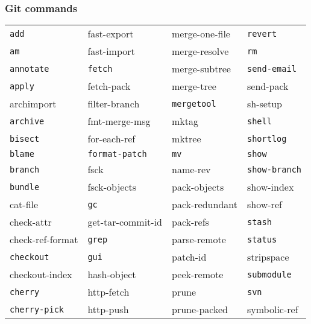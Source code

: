 \documentclass[english]{beamer}
\newcommand{\CMD}[1]{
  \texttt{\textcolor{code-green}{#1}}
}
\newcommand{\cmd}[1]{
  \texttt{\textcolor{code-orange}{#1}}
}
\newcommand{\gui}[1]{
  \texttt{\textcolor{code-blue}{#1}}
}
\begin{document}
\begin{frame}[fragile]
\frametitle{Git commands}
{\tiny \tt \textcolor{gray}{
\begin{tabular}{llll}
\CMD{add}              &      fast-export       &      merge-one-file & \cmd{revert}            \\
\cmd{am}               &      fast-import       &      merge-resolve  & \CMD{rm}                \\
\cmd{annotate}         & \CMD{fetch}            &      merge-subtree  & \cmd{send-email}        \\
\cmd{apply}            &      fetch-pack        &      merge-tree     &      send-pack          \\
     archimport        &      filter-branch     & \gui{mergetool}     &      sh-setup           \\
\cmd{archive}          &      fmt-merge-msg     &      mktag          & \gui{shell}             \\
\cmd{bisect}           &      for-each-ref      &      mktree         & \cmd{shortlog}          \\
\CMD{blame}            & \cmd{format-patch}     & \CMD{mv}            & \CMD{show}              \\
\CMD{branch}           &      fsck              &      name-rev       & \cmd{show-branch}       \\
\cmd{bundle}           &      fsck-objects      &      pack-objects   &      show-index         \\
     cat-file          & \CMD{gc}               &      pack-redundant &      show-ref           \\
     check-attr        &      get-tar-commit-id &      pack-refs      & \CMD{stash}             \\
     check-ref-format  & \CMD{grep}             &      parse-remote   & \CMD{status}            \\
\CMD{checkout}         & \gui{gui}              &      patch-id       &      stripspace         \\
     checkout-index    &      hash-object       &      peek-remote    & \CMD{submodule}         \\
\cmd{cherry}           &      http-fetch        &      prune          & \cmd{svn}               \\
\cmd{cherry-pick}      &      http-push         &      prune-packed   &      symbolic-ref       \\

\end{tabular}}}
\end{frame}
\end{document}
